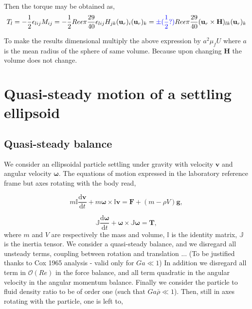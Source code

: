 \documentclass[12pt]{My_preprint}
\begin{document}
Then the torque may be obtained as, 
\begin{equation}
    T_l = - \frac{1}{2}\epsilon_{lij}M_{ij}
    =- \frac{1}{2} Re \epsilon \pi 
    \frac{29}{40} \epsilon_{lij}H_{jk}(\textbf{u}_r)_i  (\textbf{u}_r)_k
    =\color{blue}\pm(\frac{1}{2} ?)\color{black} Re \epsilon \pi 
    \frac{29}{40} (\textbf{u}_r\times \textbf{H})_{lk}  (\textbf{u}_r)_k
\end{equation}

To make the results dimensional multiply the above expression by $a^2 \mu_f U$ where $a$ is the mean radius of the sphere of same volume. Because upon changing $\textbf{H}$ the volume does not change. 

\section{Quasi-steady motion of a settling ellipsoid}

\subsection{Quasi-steady balance}
We consider an ellipsoidal particle settling under gravity with velocity $\bm v$ and angular velocity $\bm \omega$. 
The equations of motion expressed in the laboratory reference frame but axes rotating with the body read,

\begin{equation}
    m \mathbb{I}\frac{\mathrm{d}\bm v}{\mathrm{d}t} + m \bm \omega \times \mathbb{I}\bm v  = \bm F+ (m - \rho V) \mathbf{g},
    \label{eq:forcebal}
\end{equation}
    
\begin{equation}
    \mathbb{J}\frac{\mathrm{d}\bm \omega}{\mathrm{d}t} + \bm \omega \times \mathbb{J} \bm \omega  = \bm T,
    \label{eq:torquebal}
\end{equation}
where $m$ and $V$ are respectively the mass and volume, $\mathbb{I}$ is the identity matrix, $\mathbb{J}$ is the inertia tensor.
We consider a quasi-steady balance, and we disregard all unsteady terms, coupling between rotation and translation ... (To be justified thanks to Cox 1965 analysis - valid only for $Ga \ll 1$)
In addition we disregard all term in $\mathcal O(Re)$ in the force balance, and all term quadratic in the angular velocity in the angular momentum balance.
Finally we consider the particle to fluid density ratio to be of order one (such that $Ga \bar  \rho \ll 1$).
Then, still in axes rotating with the particle, one is left to,
\end{document}
